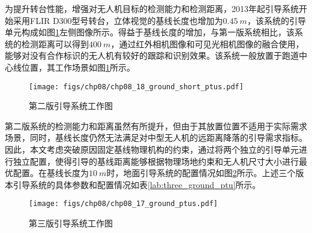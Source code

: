 为提升转台性能，增强对无人机目标的检测能力和检测距离，2013年起引导系统开始采用FLIR D300型号转台，立体视觉的基线长度也增加为$0.45\ m$，该系统的引导单元构成如图\ref{fig:chp08_18_ground_short_ptus}左侧图像所示。得益于基线长度的增加，与第一版系统相比，该系统的检测距离可以得到$400\ m$，通过红外相机图像和可见光相机图像的融合使用，能够对没有合作标识的无人机有较好的跟踪和识别效果。该系统一般放置于跑道中心线位置，其工作场景如图\ref{fig:chp08_18_ground_short_ptus}所示。

\begin{figure}[!ht]
	\centering
	\texttt{[image: figs/chp08/chp08\_18\_ground\_short\_ptus.pdf]}	
	\caption{第二版引导系统工作图}
	\label{fig:chp08_18_ground_short_ptus}
\end{figure}

第二版系统的检测能力和距离虽然有所提升，但由于其放置位置不适用于实际需求场景，同时，基线长度仍然无法满足对中型无人机的远距离降落的引导需求指标。因此，本文考虑突破原因固定基线物理机构的约束，通过将两个独立的引导单元进行独立配置，使得引导的基线距离能够根据物理场地约束和无人机尺寸大小进行最优配置。在基线长度为$10\  m$时，地面引导系统的配置情况如图\ref{fig:chp08_17_ground_ptus}所示。上述三个版本引导系统的具体参数和配置情况如表\ref{lab:three_ground_ptu}所示。

\begin{figure}[!t]
	\centering
	\texttt{[image: figs/chp08/chp08\_17\_ground\_ptus.pdf]}	
	\caption{第三版引导系统工作图}
	\label{fig:chp08_17_ground_ptus}
\end{figure}

